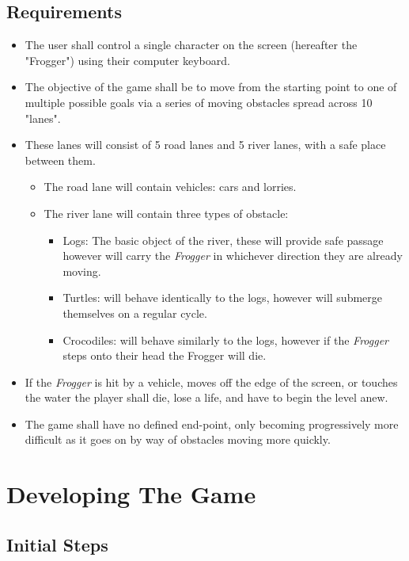 \documentclass[12pt, a4paper]{report}
\begin{document}
\subsection{Requirements}
\begin{itemize}
  \item The user shall control a single character on the screen (hereafter the "Frogger") using their computer keyboard.
  \item The objective of the game shall be to move from the starting point to one of multiple possible goals via a series of moving obstacles spread across 10 "lanes".
  \item These lanes will consist of 5 road lanes and 5 river lanes, with a safe place between them.
    \begin{itemize}
      \item The road lane will contain vehicles: cars and lorries.
      \item The river lane will contain three types of obstacle:
        \begin{itemize}
          \item Logs: The basic object of the river, these will provide safe passage however will carry the \textit{Frogger} in whichever direction they are already moving.
          \item Turtles: will behave identically to the logs, however will submerge themselves on a regular cycle.
          \item Crocodiles: will behave similarly to the logs, however if the \textit{Frogger} steps onto their head the Frogger will die.
        \end{itemize}
    \end{itemize}
  \item If the \textit{Frogger} is hit by a vehicle, moves off the edge of the screen, or touches the water the player shall die, lose a life, and have to begin the level anew.
  \item The game shall have no defined end-point, only becoming progressively more difficult as it goes on by way of obstacles moving more quickly.
\end{itemize}

\section{Developing The Game}

\subsection{Initial Steps}
\end{document}
